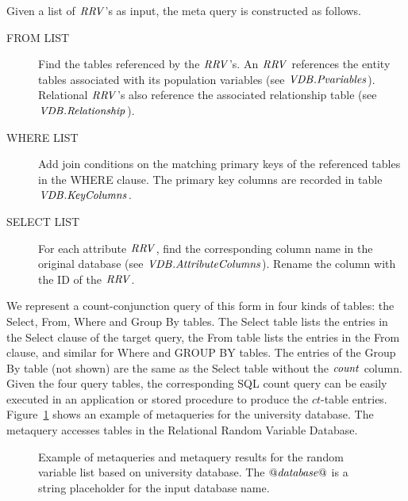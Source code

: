 \documentclass{acm_proc_article-sp}
\newcommand{\ct}{\mathit{ct}}
\begin{document}
 Given a list of $\it{RRV}$'s as input, the meta query is constructed as follows. 
\begin{description}
\item[FROM LIST] Find the tables referenced by the $\it{RRV}$'s. An $\it{RRV}$ references the entity tables associated with its population variables (see $\it{VDB}.Pvariables$). Relational $\it{RRV}$'s also reference the associated relationship table (see $\it{VDB}.Relationship$). 
\item[WHERE LIST] Add join conditions on the matching primary keys of the referenced tables in the WHERE clause. The primary key columns are recorded in table $\it{VDB}.KeyColumns$. 
\item[SELECT LIST] For each attribute $\it{RRV}$, find the corresponding column name in the original database (see $\it{VDB}.AttributeColumns$). Rename the column with the ID of the $\it{RRV}$.
\end{description}

We represent a count-conjunction query of this form in 
four kinds of tables: the Select, From, Where and Group By tables. The Select table lists the entries in the Select clause of the target query, the From table lists the entries in the From clause, and similar for Where and GROUP BY tables. The entries of the Group By table (not shown) are the same as the Select table without the $\it{count}$ column.
Given the four query tables, the corresponding SQL count query can be easily executed in an application or stored procedure to produce the $\ct$-table entries.
Figure~\ref{fig:meta-query} shows an example of metaqueries for the university database. The metaquery accesses tables in the Relational Random Variable Database. %

\begin{figure}[htb]
\begin{center}
\caption{Example of metaqueries and metaquery results for the random variable list 
based on university database. The $\it{@database@}$ is a string placeholder for the input database name. 
~\label{fig:meta-query} }
\end{center}
\end{figure}
\end{document}
